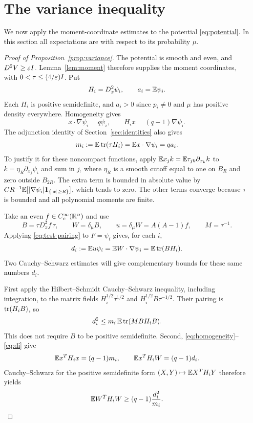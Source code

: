\section{The variance inequality}
\label{sec:variance}

We now apply the moment-coordinate estimates to the potential
\eqref{eq:potential}. In this section all expectations are with
respect to its probability $\mu$.

\begin{proof}[Proof of Proposition~\ref{prop:variance}]
The potential is smooth and even, and $D^2V\ge\varepsilon I$.
Lemma~\ref{lem:moment} therefore supplies the moment coordinates,
with $0<\tau\le (4/\varepsilon)I$. Put
\[
 H_i=D_x^2\psi_i,\qquad a_i=\mathbb E\psi_i.
\]
Each $H_i$ is positive semidefinite, and $a_i>0$ since $p_i\ne0$
and $\mu$ has positive density everywhere. Homogeneity gives
\begin{equation}\label{eq:homogeneity}
 x\cdot\nabla\psi_i=q\psi_i,
 \qquad H_ix=(q-1)\nabla\psi_i.
\end{equation}
The adjunction identity of Section~\ref{sec:identities} also gives
\begin{equation}\label{eq:mi}
 m_i:=\mathbb E\operatorname{tr}(\tau H_i)=\mathbb E x\cdot\nabla\psi_i=q a_i.
\end{equation}
To justify it for these noncompact functions, apply
$\mathbb E x_j k=\mathbb E\tau_{jk}\partial_{x_k}k$ to
$k=\eta_R\partial_{x_j}\psi_i$ and sum in $j$, where $\eta_R$
is a smooth cutoff equal to one on $B_R$ and zero outside $B_{2R}$.
The extra term is bounded in absolute value by
$C R^{-1}\mathbb E[|\nabla\psi_i|\mathbf1_{\{|x|\ge R\}}]$, which tends
to zero. The other terms converge because $\tau$ is bounded and
all polynomial moments are finite.

Take an even $f\in C_c^\infty(\mathbb R^n)$ and use
\[
 B=\tau D_x^2f\,\tau,\qquad W=\delta_\mu B,
 \qquad u=\delta_\mu W=A(A-1)f,
 \qquad M=\tau^{-1}.
\]
Applying \eqref{eq:test-pairing} to $F=\psi_i$ gives, for each $i$,
\begin{equation}\label{eq:di}
 d_i:=\mathbb E u\psi_i=\mathbb E W\cdot\nabla\psi_i=\mathbb E\operatorname{tr}(BH_i).
\end{equation}
Two Cauchy--Schwarz estimates will give complementary bounds for
these same numbers $d_i$.

First apply the Hilbert--Schmidt Cauchy--Schwarz inequality, including
integration, to the matrix fields
$H_i^{1/2}\tau^{1/2}$ and $H_i^{1/2}B\tau^{-1/2}$. Their pairing
is $\operatorname{tr}(H_iB)$, so
\begin{equation}\label{eq:first-cs}
 d_i^2\le m_i\,\mathbb E\operatorname{tr}(MBH_iB).
\end{equation}
This does not require $B$ to be positive semidefinite.
Second, \eqref{eq:homogeneity}--\eqref{eq:di} give
\[
 \mathbb E x^TH_i x=(q-1)m_i,
 \qquad \mathbb E x^TH_iW=(q-1)d_i.
\]
Cauchy--Schwarz for the positive semidefinite form
$(X,Y)\mapsto\mathbb E X^TH_iY$ therefore yields
\begin{equation}\label{eq:second-cs}
 \mathbb E W^TH_iW\ge(q-1)\frac{d_i^2}{m_i}.
\end{equation}


\end{proof}
